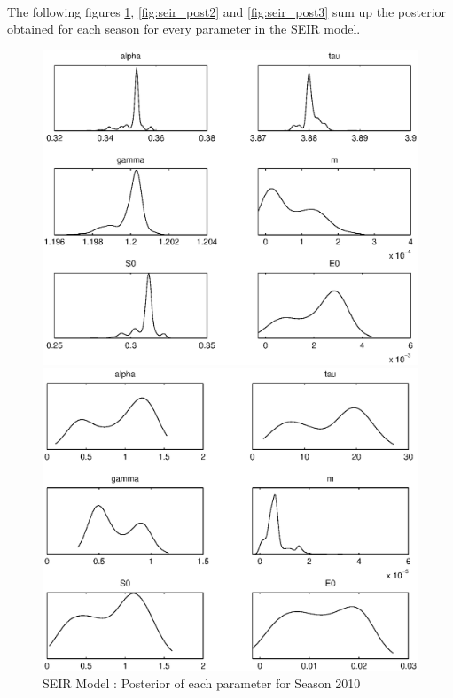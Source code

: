 \documentclass[11pt, a4paper]{article}
\begin{document}
\paragraph{}
The following figures \ref{fig:seir_post1}, \ref{fig:seir_post2} and \ref{fig:seir_post3} sum up the posterior obtained for each season for every parameter in the SEIR model.

\begin{figure}[H!]
\FloatBarrier
\centering
    \includegraphics[height = 0.25\textheight]{figures/SEIR_posterior_season1.eps}
    \caption{SEIR Model : Posterior of each parameter for Season 2010}
    \label{fig:seir_post1}
    \includegraphics[height = 0.25\textheight]{figures/SEIR_posterior_season2.eps}

\end{figure}
\end{document}
